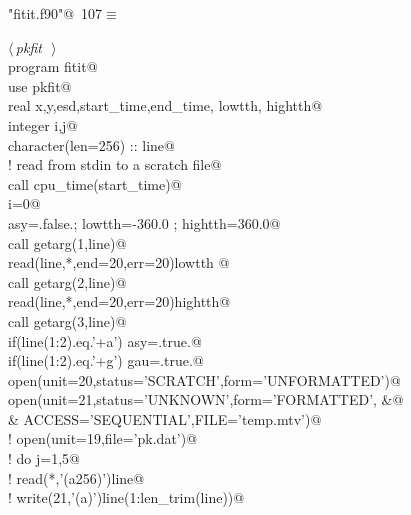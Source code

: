 \documentclass[10pt,a4paper,notitlepage]{article}
\begin{document}
\begin{flushleft} \small
\begin{minipage}{\linewidth}\label{scrap131}\raggedright\small
{} \verb@"fitit.f90"@\nobreak\ {\footnotesize {107}}$\equiv$
\vspace{-1ex}
\begin{list}{}{} \item
\mbox{}\verb@@\hbox{$\langle\,${\it pkfit}\nobreak\ {\footnotesize {}}$\,\rangle$}\verb@@\\
\mbox{}\verb@      program fitit@\\
\mbox{}\verb@      use pkfit@\\
\mbox{}\verb@      real x,y,esd,start_time,end_time, lowtth, hightth@\\
\mbox{}\verb@      integer i,j@\\
\mbox{}\verb@      character(len=256) :: line@\\
\mbox{}\verb@! read from stdin to a scratch file@\\
\mbox{}\verb@      call cpu_time(start_time)@\\
\mbox{}\verb@      i=0@\\
\mbox{}\verb@      asy=.false.; lowtth=-360.0 ; hightth=360.0@\\
\mbox{}\verb@      call getarg(1,line)@\\
\mbox{}\verb@      read(line,*,end=20,err=20)lowtth @\\
\mbox{}\verb@      call getarg(2,line)@\\
\mbox{}\verb@      read(line,*,end=20,err=20)hightth@\\
\mbox{}\verb@      call getarg(3,line)@\\
\mbox{}\verb@      if(line(1:2).eq.'+a') asy=.true.@\\
\mbox{}\verb@      if(line(1:2).eq.'+g') gau=.true.@\\
\mbox{}    open(unit=20,status='SCRATCH',form='UNFORMATTED')@\\
\mbox{}\verb@      open(unit=21,status='UNKNOWN',form='FORMATTED',                  &@\\
\mbox{}\verb@     & ACCESS='SEQUENTIAL',FILE='temp.mtv')@\\
\mbox{}\verb@!      open(unit=19,file='pk.dat')@\\
\mbox{}\verb@!      do j=1,5@\\
\mbox{}\verb@!        read(*,'(a256)')line@\\
\mbox{}\verb@!        write(21,'(a)')line(1:len_trim(line))@\\

\end{list}
\end{minipage}
\end{flushleft}
\end{document}
